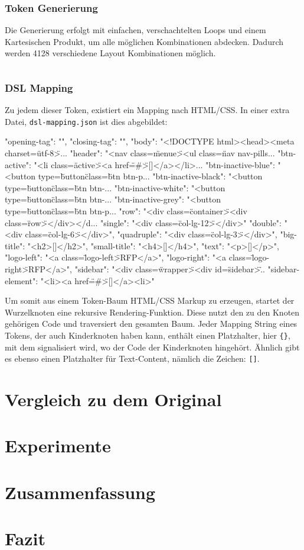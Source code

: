 \documentclass[pdftex,a4paper,halfparskip]{scrartcl}
\begin{document}
\subsubsection{Token Generierung}

Die Generierung erfolgt mit einfachen, verschachtelten Loops und einem Kartesischen Produkt, um alle möglichen Kombinationen abdecken. Dadurch werden 4128 verschiedene Layout Kombinationen möglich. 
\begin{verbatim}

\end{verbatim}
\subsubsection{DSL Mapping}

Zu jedem dieser Token, existiert ein Mapping nach HTML/CSS. In einer extra Datei, \texttt{dsl-mapping.json} ist dies abgebildet:

\begin{spverbatim}
  {
    "opening-tag": "{",
    "closing-tag": "}",
    "body": "<!DOCTYPE html>\n <head>\n <meta charset=\"utf-8\">\n ...
    "header": "<nav class=\"menue\">\n    <ul class=\"nav nav-pills...
    "btn-active": "<li class=\"active\"><a href=\"#\">[]</a></li>\n...
    "btn-inactive-blue": "<button type=\"button\" class=\"btn btn-p...
    "btn-inactive-black": "<button type=\"button\" class=\"btn btn-...
    "btn-inactive-white": "<button type=\"button\" class=\"btn btn-...
    "btn-inactive-grey": "<button type=\"button\" class=\"btn btn-p...
    "row": "<div class=\"container\"><div class=\"row\">{}</div></d...
    "single": "<div class=\"col-lg-12\">\n{}\n</div>\n"
    "double": "<div class=\"col-lg-6\">\n{}\n</div>\n",
    "quadruple": "<div class=\"col-lg-3\">\n{}\n</div>\n",
    "big-title": "<h2>[]</h2>",
    "small-title": "<h4>[]</h4>",
    "text": "<p>[]</p>\n",
    "logo-left": "<a class=\"logo-left\">RFP</a>\n",
    "logo-right": "<a class=\"logo-right\">RFP</a>\n",
    "sidebar": "<div class=\"wrapper\">\n    <div id=\"sidebar\">\...
    "sidebar-element": "<li><a href=\"#\">[]</a><li>"  
  }
  
\end{spverbatim}

Um somit aus einem Token-Baum HTML/CSS Markup zu erzeugen, startet der Wurzelknoten eine rekursive Rendering-Funktion. Diese nutzt den zu den Knoten gehörigen Code und traversiert den gesamten Baum. Jeder Mapping String eines Tokens, der auch Kinderknoten haben kann, enthält einen Platzhalter, hier \texttt{\{\}}, mit dem signalisiert wird, wo der Code der Kinderknoten hingehört. Ähnlich gibt es ebenso einen Platzhalter für Text-Content, nämlich die Zeichen: \texttt{[]}. 


\section{Vergleich zu dem Original}
\section{Experimente}
\section{Zusammenfassung}
\section{Fazit}


 
\end{document}
